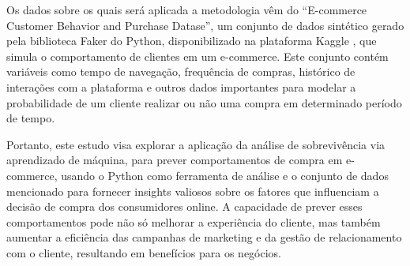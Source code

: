  Os dados sobre os quais será aplicada a metodologia vêm do ``E-commerce Customer Behavior and Purchase Datase'', um conjunto de dados sintético gerado pela biblioteca Faker do Python, disponibilizado na plataforma Kaggle \cite{kaggle}, que simula o comportamento de clientes em um e-commerce. Este conjunto contém variáveis como tempo de navegação, frequência de compras, histórico de interações com a plataforma e outros dados importantes para modelar a probabilidade de um cliente realizar ou não uma compra em determinado período de tempo.

Portanto, este estudo visa explorar a aplicação da análise de sobrevivência via aprendizado de máquina, para prever comportamentos de compra em e-commerce, usando o Python como ferramenta de análise e o conjunto de dados mencionado para fornecer insights valiosos sobre os fatores que influenciam a decisão de compra dos consumidores online. A capacidade de prever esses comportamentos pode não só melhorar a experiência do cliente, mas também aumentar a eficiência das campanhas de marketing e da gestão de relacionamento com o cliente, resultando em benefícios para os negócios.




